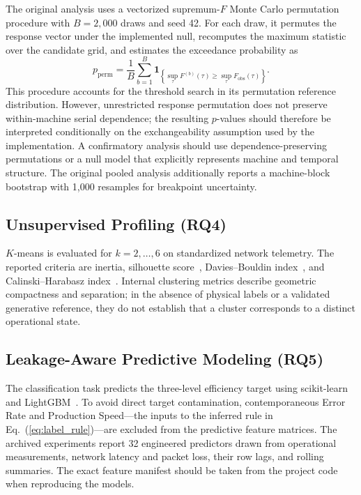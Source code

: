 \documentclass[conference]{IEEEtran}
\begin{document}
The original analysis uses a vectorized supremum-$F$ Monte Carlo permutation procedure with $B = 2,000$ draws and seed 42. For each draw, it permutes the response vector under the implemented null, recomputes the maximum statistic over the candidate grid, and estimates the exceedance probability as
\begin{equation}
p_{\text{perm}} = \frac{1}{B} \sum_{b=1}^B \mathbf{1}_{\left\{\sup_\tau F^{(b)}(\tau) \ge \sup_\tau F_{\text{obs}}(\tau)\right\}}.
\label{eq:perm_p}
\end{equation}
This procedure accounts for the threshold search in its permutation reference distribution. However, unrestricted response permutation does not preserve within-machine serial dependence; the resulting $p$-values should therefore be interpreted conditionally on the exchangeability assumption used by the implementation. A confirmatory analysis should use dependence-preserving permutations or a null model that explicitly represents machine and temporal structure. The original pooled analysis additionally reports a machine-block bootstrap with 1,000 resamples for breakpoint uncertainty.

\subsection{Unsupervised Profiling (RQ4)}
$K$-means is evaluated for $k = 2, \dots, 6$ on standardized network telemetry. The reported criteria are inertia, silhouette score~\cite{rousseeuw1987silhouettes}, Davies--Bouldin index~\cite{davies1979cluster}, and Calinski--Harabasz index~\cite{calinski1974dendrite}. Internal clustering metrics describe geometric compactness and separation; in the absence of physical labels or a validated generative reference, they do not establish that a cluster corresponds to a distinct operational state.

\subsection{Leakage-Aware Predictive Modeling (RQ5)}
The classification task predicts the three-level efficiency target using scikit-learn and LightGBM~\cite{ke2017lightgbm, pedregosa2011scikit}. To avoid direct target contamination, contemporaneous Error Rate and Production Speed---the inputs to the inferred rule in Eq.~(\ref{eq:label_rule})---are excluded from the predictive feature matrices. The archived experiments report 32 engineered predictors drawn from operational measurements, network latency and packet loss, their row lags, and rolling summaries. The exact feature manifest should be taken from the project code when reproducing the models.
\end{document}
